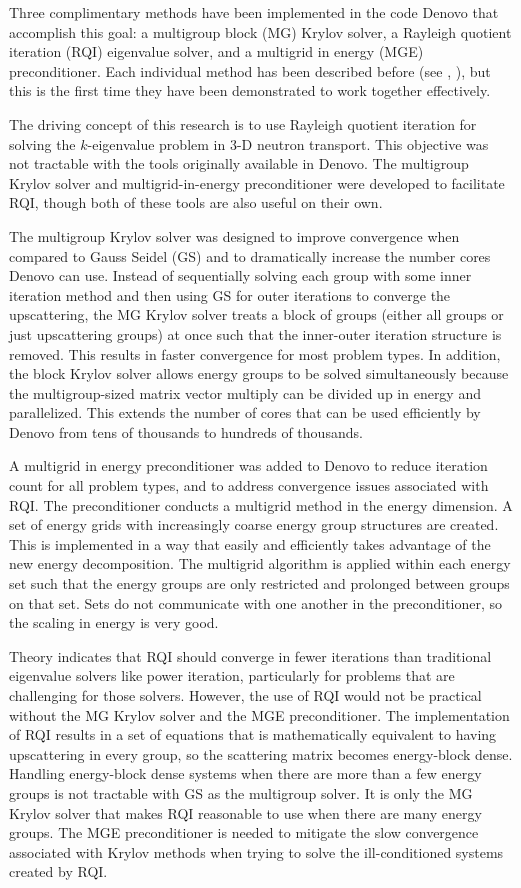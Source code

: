 \documentclass[preprint,12pt]{elsarticle}
\begin{document}
Three complimentary methods have been implemented in the code Denovo \cite{Evans2010} that accomplish this goal: a multigroup block (MG) Krylov solver, a Rayleigh quotient iteration (RQI) eigenvalue solver, and a multigrid in energy (MGE) preconditioner. Each individual method has been described before (see \cite{Slaybaugh2012}, \cite{Slaybaugh2013}), but this is the first time they have been demonstrated to work together effectively.

The driving concept of this research is to use Rayleigh quotient iteration for solving the $k$-eigenvalue problem in 3-D neutron transport. This objective was not tractable with the tools originally available in Denovo. The multigroup Krylov solver and multigrid-in-energy preconditioner were developed to facilitate RQI, though both of these tools are also useful on their own. 

The multigroup Krylov solver was designed to improve convergence when compared to Gauss Seidel (GS) and to dramatically increase the number cores Denovo can use. Instead of sequentially solving each group with some inner iteration method and then using GS for outer iterations to converge the upscattering, the MG Krylov solver treats a block of groups (either all groups or just upscattering groups) at once such that the inner-outer iteration structure is removed. This results in faster convergence for most problem types. In addition, the block Krylov solver allows energy groups to be solved simultaneously because the multigroup-sized matrix vector multiply can be divided up in energy and parallelized. This extends the number of cores that can be used efficiently by Denovo from tens of thousands to hundreds of thousands. 

A multigrid in energy preconditioner was added to Denovo to reduce iteration count for all problem types, and to address convergence issues associated with RQI. The  preconditioner conducts a multigrid method in the energy dimension. A set of energy grids with increasingly coarse energy group structures are created. This is implemented in a way that easily and efficiently takes advantage of the new energy decomposition. The multigrid algorithm is applied within each energy set such that the energy groups are only restricted and prolonged between groups on that set. Sets do not communicate with one another in the preconditioner, so the scaling in energy is very good. 

Theory indicates that RQI should converge in fewer iterations than traditional eigenvalue solvers like power iteration, particularly for problems that are challenging for those solvers. However, the use of RQI would not be practical without the MG Krylov solver and the MGE preconditioner. The implementation of RQI results in a set of equations that is mathematically equivalent to having upscattering in every group, so the scattering matrix becomes energy-block dense. Handling energy-block dense systems when there are more than a few energy groups is not tractable with GS as the multigroup solver. It is only the MG Krylov solver that makes RQI reasonable to use when there are many energy groups. The MGE preconditioner is needed to mitigate the slow convergence associated with Krylov methods when trying to solve the ill-conditioned systems created by RQI. 
\end{document}
